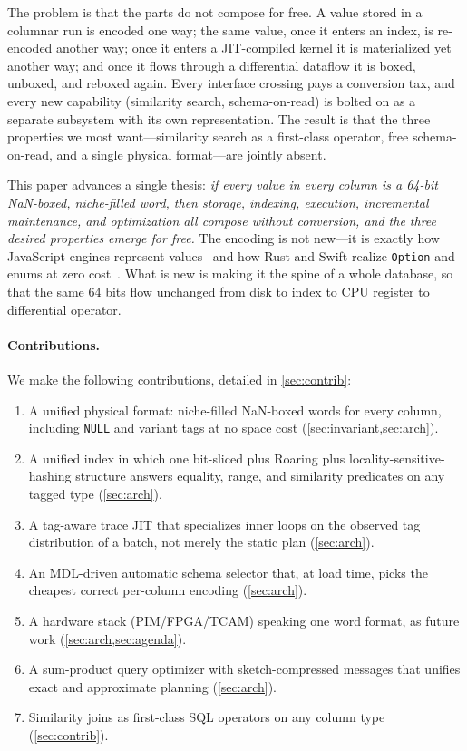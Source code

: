 \documentclass[10pt]{article}
\begin{document}
The problem is that the parts do not compose for free. A value stored
in a columnar run is encoded one way; the same value, once it enters an
index, is re-encoded another way; once it enters a JIT-compiled kernel
it is materialized yet another way; and once it flows through a
differential dataflow it is boxed, unboxed, and reboxed again. Every
interface crossing pays a conversion tax, and every new capability
(similarity search, schema-on-read) is bolted on as a separate
subsystem with its own representation. The result is that the three
properties we most want---similarity search as a first-class operator,
free schema-on-read, and a single physical format---are jointly absent.

This paper advances a single thesis: \emph{if every value in every
column is a 64-bit NaN-boxed, niche-filled word, then storage,
indexing, execution, incremental maintenance, and optimization all
compose without conversion, and the three desired properties emerge
for free.} The encoding is not new---it is exactly how JavaScript
engines represent values~\citep{wingo2011value,gal2009trace} and how
Rust and Swift realize \texttt{Option} and enums at zero
cost~\citep{grunwald2004mdl}. What is new is making it the spine of a
whole database, so that the same 64 bits flow unchanged from disk to
index to CPU register to differential operator.

\paragraph{Contributions.} We make the following contributions,
detailed in \cref{sec:contrib}:
\begin{enumerate}
  \item A unified physical format: niche-filled NaN-boxed words for
        every column, including \texttt{NULL} and variant tags at no
        space cost (\cref{sec:invariant,sec:arch}).
  \item A unified index in which one bit-sliced plus Roaring plus
        locality-sensitive-hashing structure answers equality, range,
        and similarity predicates on any tagged type
        (\cref{sec:arch}).
  \item A tag-aware trace JIT that specializes inner loops on the
        observed tag distribution of a batch, not merely the static
        plan (\cref{sec:arch}).
  \item An MDL-driven automatic schema selector that, at load time,
        picks the cheapest correct per-column encoding
        (\cref{sec:arch}).
  \item A hardware stack (PIM/FPGA/TCAM) speaking one word format, as
        future work (\cref{sec:arch,sec:agenda}).
  \item A sum-product query optimizer with sketch-compressed messages
        that unifies exact and approximate planning
        (\cref{sec:arch}).
  \item Similarity joins as first-class SQL operators on any column
        type (\cref{sec:contrib}).
\end{enumerate}
\end{document}
